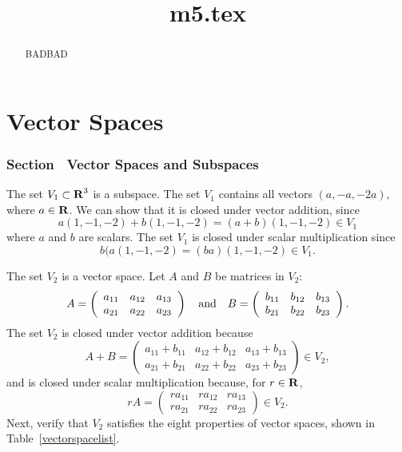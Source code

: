 \documentclass{ximera}
\title{m5.tex}
\begin{document}
\begin{abstract}
BADBAD
\end{abstract}
\maketitle

\chapter{Vector Spaces}

\subsection*{Section~\protect{\ref{S:5.1}} Vector Spaces and Subspaces}

The set $V_1 \subset \mbox{$\bf{R}$}^3$ is a subspace.
The set $V_1$ contains all vectors $(a,-a,-2a)$,
where $a \in \mbox{$\bf{R}$}$.  We can show that it is closed under
vector addition, since
\[
a(1,-1,-2) + b(1,-1,-2) = (a + b)(1,-1,-2) \in V_1
\]
where $a$ and $b$ are scalars.  The set $V_1$ is closed under scalar
multiplication since
\[
b(a(1,-1,-2) = (ba)(1,-1,-2) \in V_1.
\]

The set $V_2$ is a vector space.
Let $A$ and $B$ be matrices in $V_2$:
\[
A = \left(\begin{array}{rrr} a_{11} & a_{12} & a_{13} \\
a_{21} & a_{22} & a_{23} \end{array}\right) \quad\mbox{and}\quad
B = \left(\begin{array}{rrr} b_{11} & b_{12} & b_{13} \\
b_{21} & b_{22} & b_{23} \end{array}\right).
\]
The set $V_2$ is closed under vector addition because
\[
A + B
= \left(\begin{array}{rrr} a_{11} + b_{11} & a_{12} + b_{12} &
a_{13} + b_{13} \\ a_{21} + b_{21} & a_{22} + b_{22} &
a_{23} + b_{23} \end{array}\right) \in V_2,
\]
and is closed under scalar multiplication because, for $r \in \mbox{$\bf{R}$}$,
\[
rA = \left(\begin{array}{rrr} ra_{11} & ra_{12} & ra_{13} \\
ra_{21} & ra_{22} & ra_{23} \end{array}\right) \in V_2.
\]
Next, verify that $V_2$ satisfies the eight properties of vector
spaces, shown in Table~\ref{vectorspacelist}.
\end{document}
